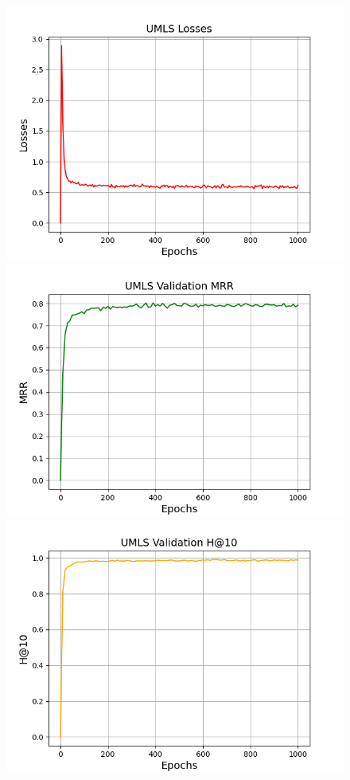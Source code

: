 \begin{figure}
    \centering
    \begin{minipage}{.3\textwidth}
      \centering
      \includegraphics[width=0.9\linewidth]{figures/results/UMLS/Pretraining/TransE/pretrain_umls_losses.png}
    \end{minipage}%
    \begin{minipage}{.3\textwidth}
      \centering
      \includegraphics[width=0.9\linewidth]{figures/results/UMLS/Pretraining/TransE/pretrain_umls_mrr.png}
    \end{minipage}
    \begin{minipage}{.3\textwidth}
      \centering
      \includegraphics[width=0.9\linewidth]{figures/results/UMLS/Pretraining/TransE/pretrain_umls_hit10.png}

\end{minipage}
\end{figure}
